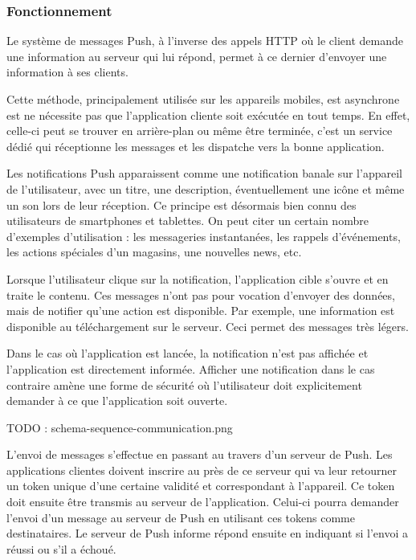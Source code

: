 \documentclass[french]{article}
\begin{document}
	\subsubsection{Fonctionnement}
	
	Le système de messages Push, à l'inverse des appels HTTP où le client demande une information au serveur qui lui répond, permet à ce dernier d'envoyer une information à ses clients.
	
	Cette méthode, principalement utilisée sur les appareils mobiles, est asynchrone est ne nécessite pas que l'application cliente soit exécutée en tout temps. En effet, celle-ci peut se trouver en arrière-plan ou même être terminée, c'est un service dédié qui réceptionne les messages et les dispatche vers la bonne application.
	
	Les notifications Push apparaissent comme une notification banale sur l'appareil de l'utilisateur, avec un titre, une description, éventuellement une icône et même un son lors de leur réception. Ce principe est désormais bien connu des utilisateurs de smartphones et tablettes. On peut citer un certain nombre d'exemples d'utilisation : les messageries instantanées, les rappels d'événements, les actions spéciales d'un magasins, une nouvelles news, etc.
	
	Lorsque l'utilisateur clique sur la notification, l'application cible s'ouvre et en traite le contenu. Ces messages n'ont pas pour vocation d'envoyer des données, mais de notifier qu'une action est disponible. Par exemple, une information est disponible au téléchargement sur le serveur. Ceci permet des messages très légers.
	
	Dans le cas où l'application est lancée, la notification n'est pas affichée et l'application est directement informée. Afficher une notification dans le cas contraire amène une forme de sécurité où l'utilisateur doit explicitement demander à ce que l'application soit ouverte.
	
	TODO : schema-sequence-communication.png

	L'envoi de messages s'effectue en passant au travers d'un serveur de Push. Les applications clientes doivent inscrire au près de ce serveur qui va leur retourner un token unique d'une certaine validité et correspondant à l'appareil. Ce token doit ensuite être transmis au serveur de l'application. Celui-ci pourra demander l'envoi d'un message au serveur de Push en utilisant ces tokens comme destinataires. Le serveur de Push informe répond ensuite en indiquant si l'envoi a réussi ou s'il a échoué. 
	
\end{document}

